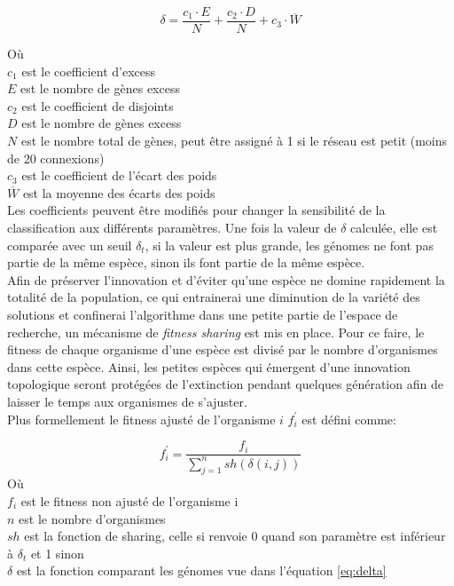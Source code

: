\documentclass{article}
\begin{document}
\begin{equation}
	\delta = \frac{c_1 \cdot E}{N} + \frac{c_2 \cdot D}{N} + c_3 \cdot \overline{W}
\label{eq:delta}
\end{equation}

Où\\
$c_1$ est le coefficient d'excess\\
$E$ est le nombre de gènes excess\\
$c_2$ est le coefficient de disjoints\\
$D$ est le nombre de gènes excess\\
$N$ est le nombre total de gènes, peut être assigné à 1 si le réseau est petit (moins de 20 connexions)\\
$c_3$ est le coefficient de l'écart des poids\\
$\overline{W}$ est la moyenne des écarts des poids\\

Les coefficients peuvent être modifiés pour changer la sensibilité de la classification aux différents paramètres. Une fois la valeur de $\delta$ calculée, elle est comparée avec un seuil $\delta_t$, si la valeur est plus grande, les génomes ne font pas partie de la même espèce, sinon ils font partie de la même espèce.\\

Afin de préserver l'innovation et d'éviter qu'une espèce ne domine rapidement la totalité de la population, ce qui entrainerai une diminution de la variété des solutions et confinerai l'algorithme dans une petite partie de l'espace de recherche, un mécanisme de \textit{fitness sharing} est mis en place. Pour ce faire, le fitness de chaque organisme d'une espèce est divisé par le nombre d'organismes dans cette espèce. Ainsi, les petites espèces qui émergent d'une innovation topologique seront protégées de l'extinction pendant quelques génération afin de laisser le temps aux organismes de s'ajuster.\\

Plus formellement le fitness ajusté de l'organisme $i$ $f^\prime_i$ est défini comme:

\begin{equation}
	f^\prime_i = \frac{f_i}{\sum^n_{j=1} sh(\delta(i,j))}
\end{equation}
Où\\
$f_i$ est le fitness non ajusté de l'organisme i\\
$n$ est le nombre d'organismes\\
$sh$ est la fonction de sharing, celle si renvoie 0 quand son paramètre est inférieur à $\delta_t$ et 1 sinon\\
$\delta$ est la fonction comparant les génomes vue dans l'équation \ref{eq:delta}\\
\end{document}
